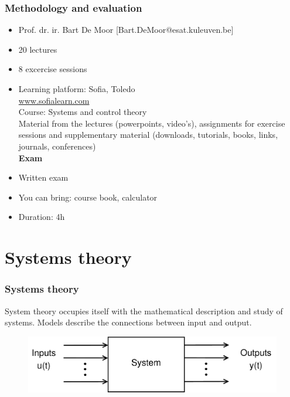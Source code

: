 \documentclass{beamer}
\begin{document}
\begin{frame}
\frametitle{Methodology and evaluation}
\begin{itemize}
\item Prof. dr. ir. Bart De Moor ‎[Bart.DeMoor@esat.kuleuven.be]‎
\item 20 lectures \\
\item 8 excercise sessions\\
\item Learning platform: Sofia, Toledo\\
\url{www.sofialearn.com}\\
Course: Systems and control theory\\
Material from the lectures (powerpoints, video's), assignments for exercise sessions and supplementary material (downloads, tutorials, books, links, journals, conferences)\\
\bigskip
\textbf{Exam}
\item Written exam
\item You can bring: course book, calculator
\item Duration: 4h
\end{itemize}
\end{frame}


\begin{frame}
\frametitle{}
\end{frame}

\section{Systems theory} 

\begin{frame}
\frametitle{Systems theory}
System theory occupies itself with the mathematical description and study of systems.
Models describe the connections between input and output.\\
\bigskip
\begin{figure}
\includegraphics[width=.9\linewidth]{systems_theory}
\end{figure}
\bigskip
\end{frame}
\end{document}
